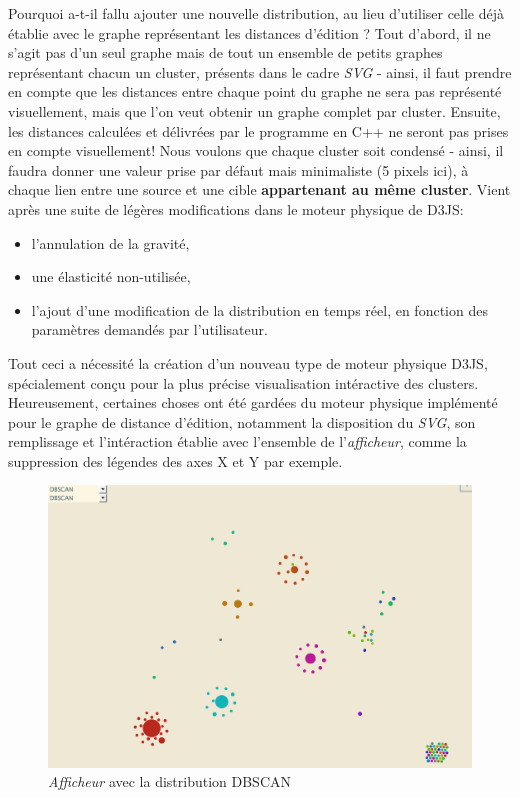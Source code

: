 \documentclass[pdftex,12pt,a4paper]{report}
\begin{document}
\begin{spacing}{1.2}
Pourquoi a-t-il fallu ajouter une nouvelle distribution, au lieu d'utiliser celle déjà établie avec le graphe représentant les distances d'édition ?
\newline
Tout d'abord, il ne s'agit pas d'un seul graphe mais de tout un ensemble de petits graphes représentant chacun un cluster, présents dans le cadre \textit{SVG} - ainsi, il faut prendre en compte que les distances entre chaque point du graphe ne sera pas représenté visuellement, mais que l'on veut obtenir un graphe complet par cluster.
\newline
Ensuite, les distances calculées et délivrées par le programme en C++ ne seront pas prises en compte visuellement! Nous voulons que chaque cluster soit condensé - ainsi, il faudra donner une valeur prise par défaut mais minimaliste (5 pixels ici), à chaque lien entre une source et une cible \textbf{appartenant au même cluster}.
\newline
Vient après une suite de légères modifications dans le moteur physique de D3JS:
	\begin{itemize}
	\item{l'annulation de la gravité,}
	\item{une élasticité non-utilisée,}
	\item{l'ajout d'une modification de la distribution en temps réel, en fonction des paramètres demandés par l'utilisateur.}
	\end{itemize}
Tout ceci a nécessité la création d'un nouveau type de moteur physique D3JS, spécialement conçu pour la plus précise visualisation intéractive des clusters.
\newline
Heureusement, certaines choses ont été gardées du moteur physique implémenté pour le graphe de distance d'édition, notamment la disposition du \textit{SVG}, son remplissage et l'intéraction établie avec l'ensemble de l'\textit{afficheur}, comme la suppression des légendes des axes X et Y par exemple.

\begin{figure}[H]
\begin{center}
	\includegraphics[scale=0.57]{img/DBSCAN-Ex.jpg}
\end{center}
\caption{\textit{Afficheur} avec la distribution DBSCAN}
\end{figure}


\end{spacing}
\end{document}
